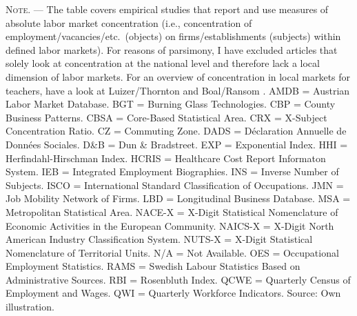 \documentclass[11pt,oneside,reqno,xcolor=dvipsnames]{article} %
\begin{document}
\begin{appendix}
\begin{refsection}
\begin{landscape}
\begin{table}[!ht]
{\begin{threeparttable}
\begin{tabular}[c]{|C{5.25cm}|C{3.75cm}C{4.25cm}:C{5cm}:C{2.75cm}C{2.5cm}C{2.5cm}|}
&&&&&& \\ \hline \hline	

\end{tabular}

\begin{tablenotes}
\item  \footnotesize \textsc{Note. ---} The table covers empirical studies that report and use measures of absolute labor market concentration (i.e., concentration of employment/vacancies/etc.\ (objects) on firms/establishments (subjects) within defined labor markets). For reasons of parsimony, I have excluded articles that solely look at concentration at the national level and therefore lack a local dimension of labor markets. For an overview of concentration in local markets for teachers, have a look at Luizer/Thornton \citeyearpar{LuizerThornton1986} and Boal/Ransom \citeyearpar{BoalRansom1997}. AMDB = Austrian Labor Market Database. BGT = Burning Glass Technologies. CBP = County Business Patterns. CBSA = Core-Based Statistical Area. CRX = X-Subject Concentration Ratio. CZ = Commuting Zone. DADS = D\'{e}claration Annuelle de Donn\'{e}es Sociales. D\&B = Dun \& Bradstreet. EXP = Exponential Index. HHI = Herfindahl-Hirschman Index. HCRIS = Healthcare Cost Report Informaton System. IEB = Integrated Employment Biographies. INS = Inverse Number of Subjects. ISCO = International Standard Classification of Occupations. JMN = Job Mobility Network of Firms. LBD = Longitudinal Business Database. MSA = Metropolitan Statistical Area. NACE-X = X-Digit Statistical Nomenclature of Economic Activities in the European Community. NAICS-X = X-Digit North American Industry Classification System. NUTS-X = X-Digit Statistical Nomenclature of Territorial Units. N/A = Not Available. OES = Occupational Employment Statistics. RAMS = Swedish Labour Statistics Based on Administrative Sources. RBI = Rosenbluth Index. QCWE = Quarterly Census of Employment and Wages. QWI = Quarterly Workforce Indicators. Source: Own illustration.
\end{tablenotes}


\end{threeparttable}
}
\end{table}


\end{landscape}


\renewcommand{\arraystretch}{1}


\clearpage



\begin{landscape}




\end{landscape}
\end{refsection}
\end{appendix}
\end{document}
